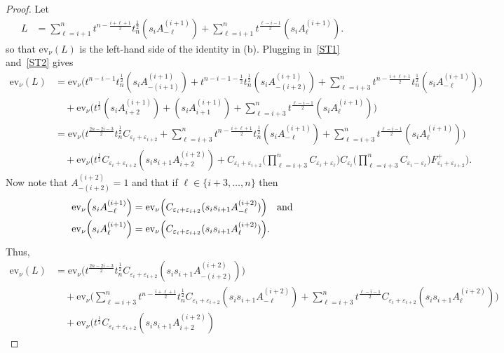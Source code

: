 \documentclass[11pt]{article}
\theoremstyle{plain}
\theoremstyle{definition}
\theoremstyle{remark}
\numberwithin{equation}{section}
\def\ev{\mathrm{ev}}
\newcounter{r}
\newcounter{s}
\begin{document}
\begin{proof}
Let 
\begin{align*}
L 
&=\sum_{\ell=i+1}^n 
t^{n-\frac{i+\ell+1}{2}} t_n^{\frac12} (s_iA^{(i+1)}_{-\ell})
+ \sum_{\ell=i+1}^n t^{\frac{\ell-i-1}{2}}(s_iA^{(i+1)}_\ell).
\end{align*}
so that $\ev_\nu(L)$ is the left-hand side of the identity in (b). 
Plugging in~\eqref{ST1} and~\eqref{ST2} gives
\begin{align*}
\ev_\nu(L) &= \ev_\nu\Big( t^{n-i-1}t_n^{\frac12} (s_i A^{(i+1)}_{-(i+1)}) +t^{n-i-1-\frac{1}{2}}t_n^{\frac12} (s_i A^{(i+1)}_{-(i+2)})
+\sum_{\ell=i+3}^n 
t^{n-\frac{i+\ell+1}{2}} t_n^{\frac12} (s_iA^{(i+1)}_{-\ell}) \Big)
\\
&\quad
+ \ev_\nu\Big(t^{\frac12} (s_iA^{(i+1)}_{i+2}) + (s_iA^{(i+1)}_{i+1}) 
+ \sum_{\ell=i+3}^n t^{\frac{\ell-i-1}{2}}(s_iA^{(i+1)}_\ell) \Big)
\\
&= \ev_\nu\Big( t^{\frac{2n-2i-3}{2}} t_n^{\frac12} C_{\varepsilon_i+\varepsilon_{i+2}}
+ \sum_{\ell=i+3}^n 
t^{n-\frac{i+\ell+1}{2}} t_n^{\frac12} (s_i A^{(i+1)}_{-\ell})
+ \sum_{\ell=i+3}^n t^{\frac{\ell-i-1}{2}} (s_iA^{(i+1)}_\ell) \Big)
\\
&\quad
+ \ev_\nu\Big( t^{\frac12} C_{\varepsilon_i+\varepsilon_{i+2}}(s_is_{i+1}A^{(i+2)}_{i+2})
+ C_{\varepsilon_i+\varepsilon_{i+2}} \Big(\prod_{\ell=i+3}^n C_{\varepsilon_i+\varepsilon_\ell}\Big)
C_{\varepsilon_i}
\Big(\prod_{\ell=i+3}^n C_{\varepsilon_i-\varepsilon_\ell}\Big)
F^+_{\varepsilon_i+\varepsilon_{i+2}}\Big).
\end{align*}
Now note that $A^{(i+2)}_{-(i+2)}=1$ and that if $\ell\in \{i+3, \ldots, n\}$ then
\begin{align*}
\ev_\nu\Big(s_iA^{(i+1)}_{-\ell}\Big)
&= \ev_\nu\Big( C_{\varepsilon_i+\varepsilon_{i+2}}(s_is_{i+1}A^{(i+2)}_{-\ell}) \Big)
\quad\hbox{and}  \\
\ev_\nu\Big(s_iA^{(i+1)}_{\ell}\Big)
&= \ev_\nu\Big( C_{\varepsilon_i+\varepsilon_{i+2}}(s_is_{i+1}A^{(i+2)}_\ell) \Big).
\end{align*}
Thus, 
\begin{align*}
\ev_\nu (L) 
&= \ev_\nu\Big(t^{\frac{2n-2i-3}{2}}t_n^{\frac12} C_{\varepsilon_i+\varepsilon_{i+2}} (s_is_{i+1}A^{(i+2)}_{-(i+2)})\Big) \\
&\quad
+ \ev_\nu\Big(\sum_{\ell=i+3}^n 
t^{n-\frac{i+\ell+1}{2}} t_n^{\frac12} C_{\varepsilon_i+\varepsilon_{i+2}}(s_is_{i+1}A^{(i+2)}_{-\ell})
+ \sum_{\ell=i+3}^n t^{\frac{\ell-i-1}{2}}C_{\varepsilon_i+\varepsilon_{i+2}}(s_is_{i+1}A^{(i+2)}_\ell) \Big)
\\
&\quad
+ \ev_\nu\Big(t^{\frac12} C_{\varepsilon_i+\varepsilon_{i+2}}(s_is_{i+1}A^{(i+2)}_{i+2})

\end{align*}
\end{proof}
\end{document}
